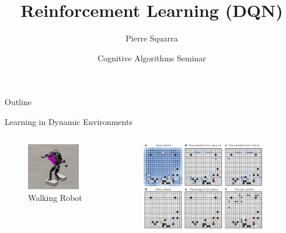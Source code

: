 \documentclass[xcolor=dvipsnames]{beamer}
\title{Reinforcement Learning (DQN)}
\author{Pierre Squarra}
\date{Cognitive Algorithms Seminar}
\begin{document}
{
\begin{frame}
  \titlepage
\end{frame}
}

\begin{frame}{Outline}
\tableofcontents
\end{frame}

\begin{frame}{Learning in Dynamic Environments}
    \begin{columns}
        \begin{column}{0.5\textwidth}
            \begin{figure}
                \centering
                \includegraphics[width=0.9\textwidth]{images/atlas.jpg}
                \caption{Walking Robot \cite{wiedebach_walking_2016}}
                \label{fig:walking-robot}
            \end{figure}
        \end{column}
        \begin{column}{0.5\textwidth}
            \begin{figure}
                \centering
                \includegraphics[width=0.9\textwidth]{images/alphago.jpg}

\end{figure}
\end{column}
\end{columns}
\end{frame}
\end{document}
